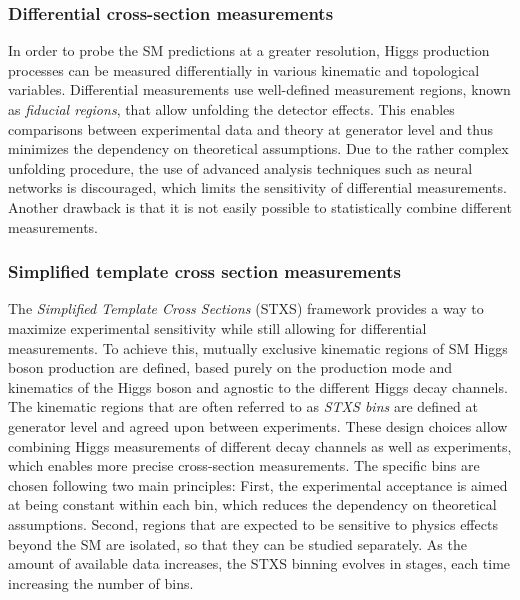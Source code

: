 \subsubsection{Differential cross-section measurements}
In order to probe the SM predictions at a greater resolution, Higgs production processes can be measured differentially in various kinematic and topological variables.
Differential measurements use well-defined measurement regions, known as \emph{fiducial regions}, that allow unfolding the detector effects. 
This enables comparisons between experimental data and theory at generator level and thus minimizes the dependency on theoretical assumptions. 
Due to the rather complex unfolding procedure, the use of advanced analysis techniques such as neural networks is discouraged, which limits the sensitivity of differential measurements.
Another drawback is that it is not easily possible to statistically combine different measurements. 


\subsubsection{Simplified template cross section measurements}
The \emph{Simplified Template Cross Sections} (STXS) framework provides a way to maximize experimental sensitivity while still allowing for differential measurements.
To achieve this, mutually exclusive kinematic regions of SM Higgs boson production are defined, based purely on the production mode and kinematics of the Higgs boson and agnostic to the different Higgs decay channels. The kinematic regions that are often referred to as \emph{STXS bins} are defined at generator level and agreed upon between experiments.
These design choices allow combining Higgs measurements of different decay channels as well as experiments, which enables more precise cross-section measurements.
The specific bins are chosen following two main principles: First, the experimental acceptance is aimed at being constant within each bin, which reduces the dependency on theoretical assumptions. Second, regions that are expected to be sensitive to physics effects beyond the SM are isolated, so that they can be studied separately.
As the amount of available data increases, the STXS binning evolves in stages, each time increasing the number of bins. 

